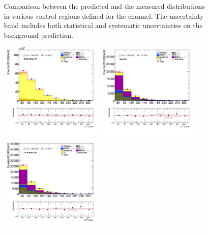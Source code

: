 \begin{figure}[!thp]
\begin{center}
			\end{center}
			\caption{
			Comparison between the predicted and the measured \Etm distributions in various control regions defined for the \taujets channel. The uncertainty band includes both statistical and systematic uncertainties on the background prediction. 
			}
			\label{fig:bkg-met-taujets}
		\end{figure}


		\begin{figure}[!thp]
			\begin{center}    
			\includegraphics[width=0.45\textwidth]{chapters/chapter6_HPlus/images/taulep/met_et_DILEP_BTAG.png}
			\includegraphics[width=0.45\textwidth]{chapters/chapter6_HPlus/images/taulep/met_et_ZEE.png} \\
			\includegraphics[width=0.45\textwidth]{chapters/chapter6_HPlus/images/taulep/met_et_TAUEL_BVETO.png} 

\end{center}
\end{figure}

